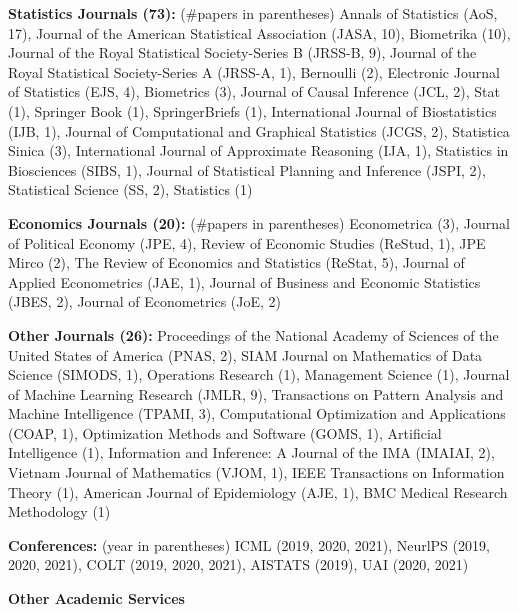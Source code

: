 \documentclass{article}
\begin{document}
\vspace{2mm}
\noindent \textbf{Statistics Journals (73): }(\#papers in parentheses) Annals of Statistics (AoS, 17), Journal of the American Statistical Association (JASA, 10), Biometrika (10), Journal of the Royal Statistical Society-Series B (JRSS-B, 9), Journal of the Royal Statistical Society-Series A (JRSS-A, 1), Bernoulli (2), Electronic Journal of Statistics (EJS, 4), Biometrics (3), Journal of Causal Inference (JCL, 2), Stat (1), Springer Book (1), SpringerBriefs (1), International Journal of Biostatistics (IJB, 1), Journal of Computational and Graphical Statistics (JCGS, 2), Statistica Sinica (3), International Journal of Approximate Reasoning (IJA, 1), Statistics in Biosciences (SIBS, 1), Journal of Statistical Planning and Inference (JSPI, 2), Statistical Science (SS, 2), Statistics (1)

\vspace{2mm}
\noindent \textbf{Economics Journals (20): }(\#papers in parentheses) Econometrica (3), Journal of Political Economy (JPE, 4), Review of Economic Studies (ReStud, 1), JPE Mirco (2), The Review of Economics and Statistics (ReStat, 5), Journal of Applied Econometrics (JAE, 1), Journal of Business and Economic Statistics (JBES, 2), Journal of Econometrics (JoE, 2)

\vspace{2mm}
\noindent \textbf{Other Journals (26): } Proceedings of the National Academy of Sciences of the United States of America (PNAS, 2), SIAM Journal on Mathematics of Data Science (SIMODS, 1), Operations Research (1), Management Science (1), Journal of Machine Learning Research (JMLR, 9), Transactions on Pattern Analysis and Machine Intelligence (TPAMI, 3), Computational Optimization and Applications (COAP, 1), Optimization Methods and Software (GOMS, 1), Artificial Intelligence (1), Information and Inference: A Journal of the IMA (IMAIAI, 2), Vietnam Journal of Mathematics (VJOM, 1), IEEE Transactions on Information Theory (1), American Journal of Epidemiology (AJE, 1), BMC Medical Research Methodology (1)

\vspace{2mm}
\noindent \textbf{Conferences: }(year in parentheses) ICML (2019, 2020, 2021), NeurlPS (2019, 2020, 2021), COLT (2019, 2020, 2021), AISTATS (2019), UAI (2020, 2021)

\vspace{7mm}
\begin{large}
\noindent \textbf{Other Academic Services}
\end{large}
\end{document}
